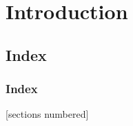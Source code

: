 \section{Introduction}

\subsection{Index}

\begin{frame}
    \frametitle{Index}
    [sections numbered]
    \tableofcontents[hideallsubsections, part=1]
\end{frame}
